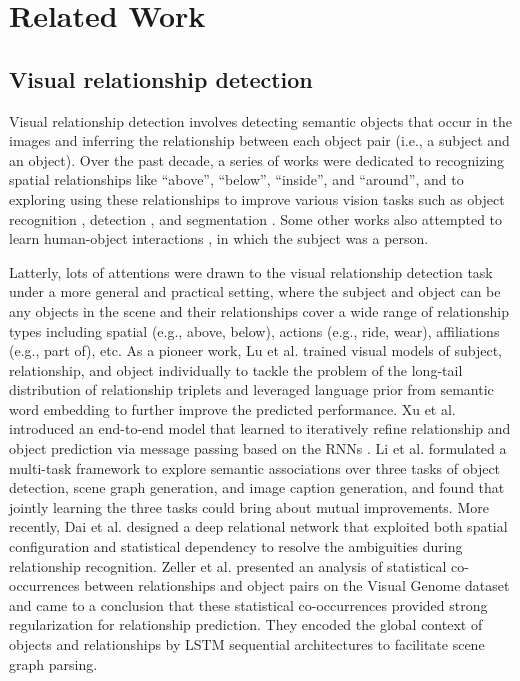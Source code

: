 \documentclass[10pt,twocolumn,letterpaper]{article}
\begin{document}
\section{Related Work}


\subsection{Visual relationship detection}
Visual relationship detection involves detecting semantic objects that occur in the images and inferring the relationship between each object pair (i.e., a subject and an object). Over the past decade, a series of works were dedicated to recognizing spatial relationships \cite{galleguillos2008object,gould2008multi,choi2013understanding} like ``above'', ``below'', ``inside'', and ``around'', and to exploring using these relationships to improve various vision tasks such as object recognition \cite{galleguillos2008object}, detection \cite{fang2017object}, and segmentation \cite{gould2008multi}. Some other works also attempted to learn human-object interactions \cite{yao2010grouplet,chao2017learning}, in which the subject was a person. 

Latterly, lots of attentions \cite{lu2016visual,xu2017scene,dai2017detecting,li2017scene,newell2017pixels,zellers2017neural,newell2017pixels} were drawn to the visual relationship detection task under a more general and practical setting, where the subject and object can be any objects in the scene and their relationships cover a wide range of relationship types including spatial (e.g., above, below), actions (e.g., ride, wear), affiliations (e.g., part of), etc. As a pioneer work, Lu et al. \cite{lu2016visual} trained visual models of subject, relationship, and object individually to tackle the problem of the long-tail distribution of relationship triplets and leveraged language prior from semantic word embedding to further improve the predicted performance. Xu et al. \cite{xu2017scene} introduced an end-to-end model that learned to iteratively refine relationship and object prediction via message passing based on the RNNs \cite{mikolov2010recurrent}. Li et al. \cite{li2017scene} formulated a multi-task framework to explore semantic associations over three tasks of object detection, scene graph generation, and image caption generation, and found that jointly learning the three tasks could bring about mutual improvements. More recently, Dai et al. \cite{dai2017detecting} designed a deep relational network that exploited both spatial configuration and statistical dependency to resolve the ambiguities during relationship recognition. Zeller et al. \cite{zellers2017neural} presented an analysis of statistical co-occurrences between relationships and object pairs on the Visual Genome dataset \cite{krishna2017visual} and came to a conclusion that these statistical co-occurrences provided strong regularization for relationship prediction. They encoded the global context of objects and relationships by LSTM sequential architectures \cite{hochreiter1997long} to facilitate scene graph parsing. 
\end{document}
